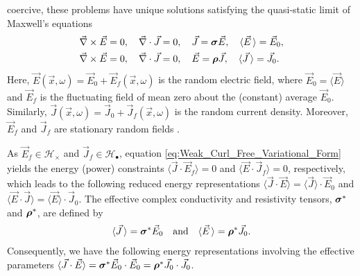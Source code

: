 \documentclass{cmslatex}
\newcommand\bsig{\mbox{\boldmath${\sigma}$}}
\newcommand\brho{\mbox{\boldmath${\rho}$}}
\begin{document}
coercive, these problems have unique solutions
\cite{Golden:CMP-473,Papanicolaou:RF-835} satisfying the quasi-static
limit of Maxwell's equations  \cite{Jackson-1999} 
%
\begin{align}   \label{eq:Maxwells_Equations_E}  
 &\vec{\nabla}\times\vec{E}=0, \quad
  \vec{\nabla}\cdot\vec{J}=0,\quad
  \vec{J}=\bsig\vec{E},\quad
  \langle\vec{E}\,\rangle=\vec{E}_0, \\
%
   &\vec{\nabla}\times\vec{E}=0, \quad
   \vec{\nabla}\cdot\vec{J}=0, \quad
   \vec{E}=\brho\vec{J},\quad
   \langle\vec{J}\,\rangle=\vec{J}_0.
   \notag  
\end{align}
%
Here, $\vec{E}(\vec{x},\omega)=\vec{E}_0+\vec{E}_f(\vec{x},\omega)$ is the
random electric field, where $\vec{E}_0=\langle\vec{E}\rangle$ and $\vec{E}_f$ is
the fluctuating field of mean zero about the (constant) average
$\vec{E}_0$. Similarly,
$\vec{J}(\vec{x},\omega)=\vec{J}_0+\vec{J}_f(\vec{x},\omega)$ is the random 
current density. Moreover, $\vec{E}_f$ and $\vec{J}_f$ are stationary
random fields \cite{Golden:CMP-473}. 




As $\vec{E}_f\in\mathscr{H}_\times$ and $\vec{J}_f\in\mathscr{H}_\bullet$, equation
\eqref{eq:Weak_Curl_Free_Variational_Form} yields the energy (power)
\cite{Jackson-1999} constraints $\langle\vec{J}\cdot\vec{E}_f\rangle=0$ and
$\langle\vec{E}\cdot\vec{J}_f\rangle=0$, respectively, which leads to the following
reduced energy representations $\langle\vec{J}\cdot\vec{E}\rangle=\langle\vec{J}\rangle\cdot\vec{E}_0$
and $\langle\vec{E}\cdot\vec{J}\rangle=\langle\vec{E}\rangle\cdot\vec{J}_0$. The effective complex
conductivity and resistivity tensors, $\bsig^*$ and $\brho^*$, are
defined by   
%
\begin{align}\label{eq:eff_eps_def}
    \langle \vec{J} \,\rangle=  \bsig^* \vec{E}_0
    \quad \text{and} \quad    
    \langle \vec{E} \,\rangle=  \brho^*\vec{J}_0.
\end{align}
%
Consequently, we have the following energy representations involving
the effective parameters
$\langle\vec{J}\cdot\vec{E}\rangle=\bsig^*\vec{E}_0\cdot\vec{E}_0=\brho^*\vec{J}_0\cdot\vec{J}_0$.
\end{document}
